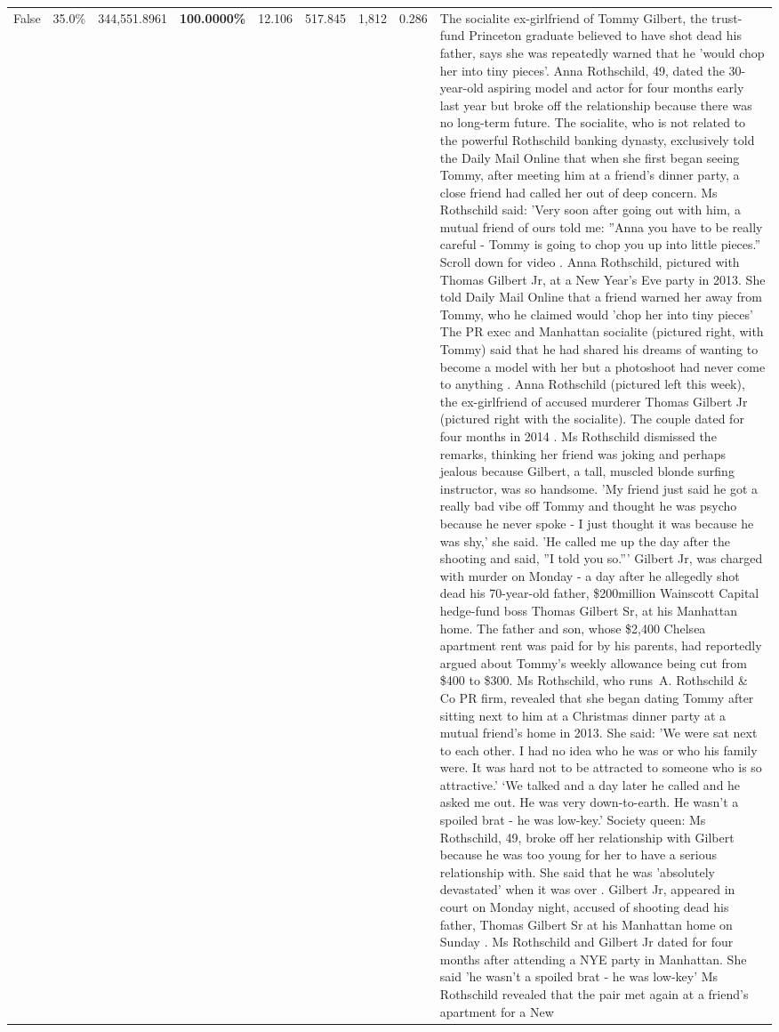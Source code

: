 \begin{table}[H]
\begin{tabular}{lllrlllll}
False & 35.0\% & 344,551.8961 & \bfseries \color{red} 100.0000\% & 12.106 & 517.845 & 1,812 & 0.286 & The socialite ex-girlfriend of Tommy Gilbert, the trust-fund Princeton graduate believed to have shot dead his father, says she was repeatedly warned that he 'would chop her into tiny pieces'. Anna Rothschild, 49, dated the 30-year-old aspiring model and actor for four months early last year but broke off the relationship because there was no long-term future. The socialite, who is not related to the powerful Rothschild banking dynasty, exclusively told the Daily Mail Online that when she first began seeing Tommy, after meeting him at a friend's dinner party, a close friend had called her out of deep concern. Ms Rothschild said: 'Very soon after going out with him, a mutual friend of ours told me: ''Anna you have to be really careful - Tommy is going to chop you up into little pieces.'' Scroll down for video . Anna Rothschild, pictured with Thomas Gilbert Jr, at a New Year's Eve party in 2013. She told Daily Mail Online that a friend warned her away from Tommy, who he claimed would 'chop her into tiny pieces' The PR exec and Manhattan socialite (pictured right, with Tommy) said that he had shared his dreams of wanting to become a model with her but a photoshoot had never come to anything . Anna Rothschild (pictured left this week), the ex-girlfriend of accused murderer Thomas Gilbert Jr (pictured right with the socialite). The couple dated for four months in 2014 . Ms Rothschild dismissed the remarks, thinking her friend was joking and perhaps jealous because Gilbert, a tall, muscled blonde surfing instructor, was so handsome. 'My friend just said he got a really bad vibe off Tommy and thought he was psycho because he never spoke - I just thought it was because he was shy,' she said. 'He called me up the day after the shooting and said, ''I told you so.''' Gilbert Jr, was charged with murder on Monday - a day after he allegedly shot dead his 70-year-old father, \$200million Wainscott Capital hedge-fund boss Thomas Gilbert Sr, at his Manhattan home. The father and son, whose \$2,400 Chelsea apartment rent was paid for by his parents, had reportedly argued about Tommy's weekly allowance being cut from \$400 to \$300. Ms Rothschild, who runs A. Rothschild \& Co PR firm, revealed that she began dating Tommy after sitting next to him at a Christmas dinner party at a mutual friend's home in 2013. She said: 'We were sat next to each other. I had no idea who he was or who his family were. It was hard not to be attracted to someone who is so attractive.' ‘We talked and a day later he called and he asked me out. He was very down-to-earth. He wasn’t a spoiled brat - he was low-key.’ Society queen: Ms Rothschild, 49, broke off her relationship with Gilbert because he was too young for her to have a serious relationship with. She said that he was 'absolutely devastated' when it was over . Gilbert Jr, appeared in court on Monday night, accused of shooting dead his father, Thomas Gilbert Sr at his Manhattan home on Sunday . Ms Rothschild and Gilbert Jr dated for four months after attending a NYE party in Manhattan. She said 'he wasn't a spoiled brat - he was low-key' Ms Rothschild revealed that the pair met again at a friend’s apartment for a New 
\end{tabular}
\end{table}

